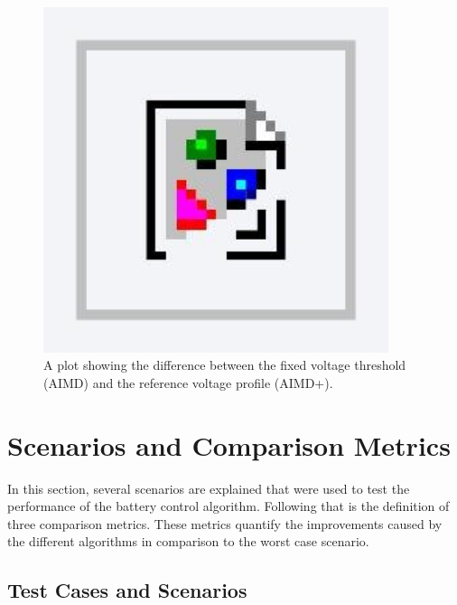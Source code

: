 \begin{figure}\centering
 \includegraphics[width=0.90\textwidth]{foo}
 \caption{A plot showing the difference between the fixed voltage threshold (AIMD) and the reference voltage profile (AIMD+).}
 \label{fig-ref-voltage-plot}
\end{figure}

\section{Scenarios and Comparison Metrics}
\label{sec-scenarios-and-comparison-metrics}

In this section, several scenarios are explained that were used to test the performance of the battery control algorithm. Following that is the definition of three comparison metrics. These metrics quantify the improvements caused by the different algorithms in comparison to the worst case scenario.

\subsection{Test Cases and Scenarios}
\label{subsec-cases}

